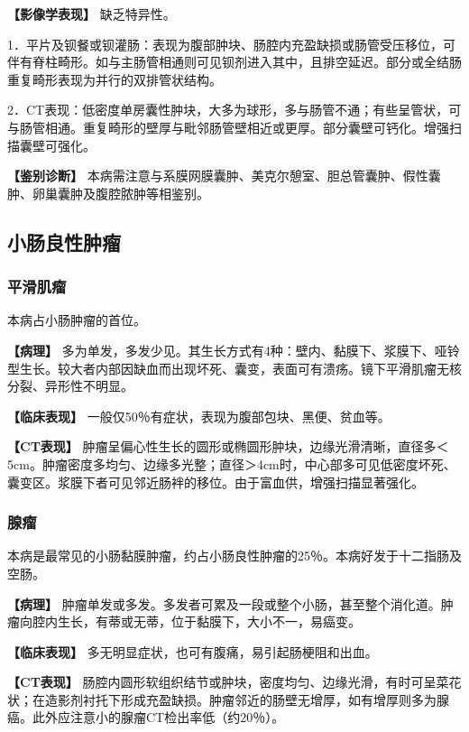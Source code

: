 \textbf{【影像学表现】} 缺乏特异性。

1．平片及钡餐或钡灌肠：表现为腹部肿块、肠腔内充盈缺损或肠管受压移位，可伴有脊柱畸形。如与主肠管相通则可见钡剂进入其中，且排空延迟。部分或全结肠重复畸形表现为并行的双排管状结构。

2．CT表现：低密度单房囊性肿块，大多为球形，多与肠管不通；有些呈管状，可与肠管相通。重复畸形的壁厚与毗邻肠管壁相近或更厚。部分囊壁可钙化。增强扫描囊壁可强化。

\textbf{【鉴别诊断】}
本病需注意与系膜网膜囊肿、美克尔憩室、胆总管囊肿、假性囊肿、卵巢囊肿及腹腔脓肿等相鉴别。

\subsection{小肠良性肿瘤}

\subsubsection{平滑肌瘤}

本病占小肠肿瘤的首位。

\textbf{【病理】}
多为单发，多发少见。其生长方式有4种：壁内、黏膜下、浆膜下、哑铃型生长。较大者内部因缺血而出现坏死、囊变，表面可有溃疡。镜下平滑肌瘤无核分裂、异形性不明显。

\textbf{【临床表现】} 一般仅50％有症状，表现为腹部包块、黑便、贫血等。

\textbf{【CT表现】}
肿瘤呈偏心性生长的圆形或椭圆形肿块，边缘光滑清晰，直径多＜5cm。肿瘤密度多均匀、边缘多光整；直径＞4cm时，中心部多可见低密度坏死、囊变区。浆膜下者可见邻近肠袢的移位。由于富血供，增强扫描显著强化。

\subsubsection{腺瘤}

本病是最常见的小肠黏膜肿瘤，约占小肠良性肿瘤的25％。本病好发于十二指肠及空肠。

\textbf{【病理】}
肿瘤单发或多发。多发者可累及一段或整个小肠，甚至整个消化道。肿瘤向腔内生长，有蒂或无蒂，位于黏膜下，大小不一，易癌变。

\textbf{【临床表现】} 多无明显症状，也可有腹痛，易引起肠梗阻和出血。

\textbf{【CT表现】}
肠腔内圆形软组织结节或肿块，密度均匀、边缘光滑，有时可呈菜花状；在造影剂衬托下形成充盈缺损。肿瘤邻近的肠壁无增厚，如有增厚则多为腺癌。此外应注意小的腺瘤CT检出率低（约20％）。


